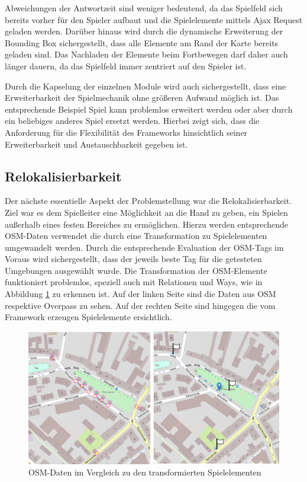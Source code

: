 Abweichungen der Antwortzeit sind weniger bedeutend, da das Spielfeld sich bereits vorher für den Spieler aufbaut und die Spielelemente mittels Ajax Request geladen werden. Darüber hinaus wird durch die dynamische Erweiterung der Bounding Box sichergestellt, dass alle Elemente am Rand der Karte bereits geladen sind. Das Nachladen der Elemente beim Fortbewegen darf daher auch länger dauern, da das Spielfeld immer zentriert auf den Spieler ist.

Durch die Kapselung der einzelnen Module wird auch sichergestellt, dass eine Erweiterbarkeit der Spielmechanik ohne größeren Aufwand möglich ist. Das entsprechende Beispiel Spiel kann problemlos erweitert werden oder aber durch ein beliebiges anderes Spiel ersetzt werden.
Hierbei zeigt sich, dass die Anforderung für die Flexibilität des Frameworks hinsichtlich seiner Erweiterbarkeit und Austauschbarkeit gegeben ist.

\subsection*{Relokalisierbarkeit}

Der nächste essentielle Aspekt der Problemstellung war die Relokalisierbarkeit. Ziel war es dem Spielleiter eine Möglichkeit an die Hand zu geben, ein Spielen außerhalb eines festen Bereiches zu ermöglichen. Hierzu werden entsprechende OSM-Daten verwendet die durch eine Transformation zu Spielelementen umgewandelt werden. Durch die entsprechende Evaluation der OSM-Tags im Voraus wird sichergestellt, dass der jeweils beste Tag für die getesteten Umgebungen ausgewählt wurde.
Die Transformation der OSM-Elemente funktioniert problemlos, speziell auch mit Relationen und Ways, wie in Abbildung \ref{img:ch6_img02_transform} zu erkennen ist. Auf der linken Seite sind die Daten aus OSM respektive Overpass zu sehen. Auf der rechten Seite sind hingegen die vom Framework erzeugen Spielelemente ersichtlich.


\begin{figure}[H]
\begin{center}
\includegraphics[width=150mm]{images/ch6_img02_transform.png}
\caption{OSM-Daten im Vergleich zu den transformierten Spielelementen}
\label{img:ch6_img02_transform}
\end{center}
\end{figure}

